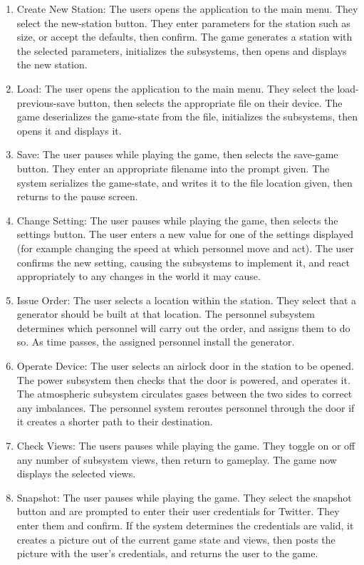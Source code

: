 \documentclass[]{article}
\begin{document}
\begin{enumerate}
	\item Create New Station: The users opens the application to the main menu. They select the new-station button. They enter parameters for the station such as size, or accept the defaults, then confirm. The game generates a station with the selected parameters, initializes the subsystems, then opens and displays the new station.
	\item Load: The user opens the application to the main menu. They select the load-previous-save button, then selects the appropriate file on their device. The game deserializes the game-state from the file, initializes the subsystems, then opens it and displays it.
	\item Save: The user pauses while playing the game, then selects the save-game button. They enter an appropriate filename into the prompt given. The system serializes the game-state, and writes it to the file location given, then returns to the pause screen.
	\item Change Setting: The user pauses while playing the game, then selects the settings button. The user enters a new value for one of the settings displayed (for example changing the speed at which personnel move and act). The user confirms the new setting, causing the subsystems to implement it, and react appropriately to any changes in the world it may cause.
	\item Issue Order: The user selects a location within the station. They select that a generator should be built at that location. The personnel subsystem determines which personnel will carry out the order, and assigns them to do so. As time passes, the assigned personnel install the generator.
	\item Operate Device: The user selects an airlock door in the station to be opened. The power subsystem then checks that the door is powered, and operates it. The atmospheric subsystem circulates gases between the two sides to correct any imbalances. The personnel system reroutes personnel through the door if it creates a shorter path to their destination.
	\item Check Views: The users pauses while playing the game. They toggle on or off any number of subsystem views, then return to gameplay. The game now displays the selected views.
	\item Snapshot: The user pauses while playing the game. They select the snapshot button and are prompted to enter their user credentials for Twitter. They enter them and confirm. If the system determines the credentials are valid, it creates a picture out of the current game state and views, then posts the picture with the user's credentials, and returns the user to the game.
\end{enumerate}
\end{document}
